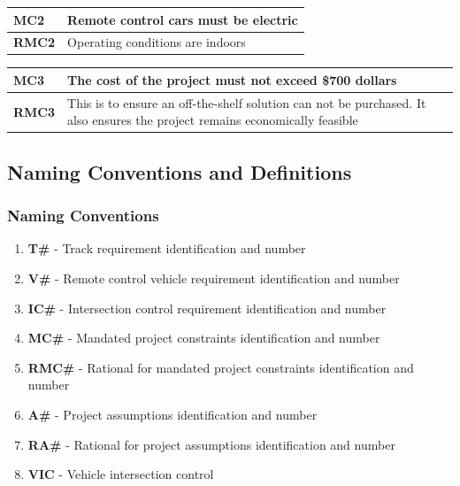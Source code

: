 \documentclass [12pt]{article}
\begin{document}
\begin{longtable}{| p{ } | p{ } | }\hline 

\textbf{MC2}& \textbf{Remote control cars must be electric}\\ \hline 
\textbf{RMC2} & Operating conditions are indoors  \\ \hline 

\end{longtable}

%
\begin{longtable}{| p{ } | p{ } | }\hline 
\textbf{MC3} & \textbf{The cost of the project must not exceed \$700 dollars} \\ \hline
\textbf{RMC3} & This is to ensure an off-the-shelf solution can not be purchased. It also ensures the project remains economically feasible \\ \hline
\end{longtable}


\subsection{Naming Conventions and Definitions}
\subsubsection{Naming Conventions}
\begin{enumerate}
	\itemsep0pt 
 	\item \textbf{T\#} - Track requirement identification  and number
	\item \textbf{V\#} - Remote control vehicle requirement identification  and number				
	\item \textbf{IC\#} - Intersection control requirement identification  and number
	\item \textbf{MC\#} - Mandated project constraints identification and number 
	\item \textbf{RMC\#} - Rational for mandated project constraints identification and number
	\item \textbf{A\#} - Project assumptions identification and number
	\item \textbf{RA\#} - Rational for project assumptions identification and number
	\item \textbf{VIC} - Vehicle intersection control
\end{enumerate}
\end{document}
